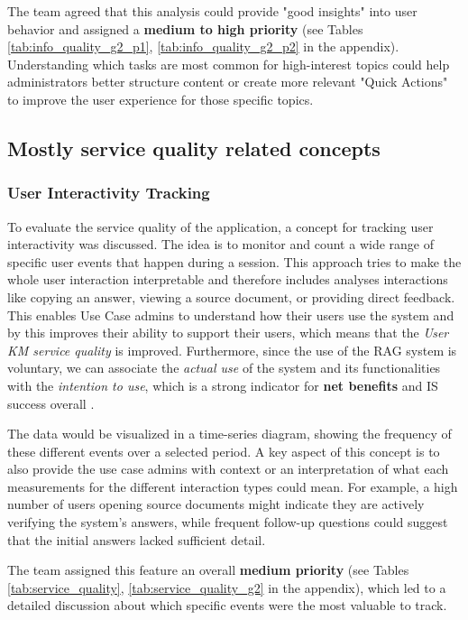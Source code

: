 \documentclass[
	english,
	ruledheaders=section,%
	class=report,%
	thesis={type=bachelor},%
	accentcolor=1b,%
	custommargins=true,%
	marginpar=false,%
	parskip=half-,%
	fontsize=11pt,%
	DIV=14,
]{tudapub}
\begin{document}
The team agreed that this analysis could provide "good insights" into user behavior and assigned a \textbf{medium to high priority} (see Tables \ref{tab:info_quality_g2_p1}, \ref{tab:info_quality_g2_p2} in the appendix). Understanding which tasks are most common for high-interest topics could help administrators better structure content or create more relevant "Quick Actions" to improve the user experience for those specific topics.
\subsection{Mostly service quality related concepts}
\subsubsection{User Interactivity Tracking}
To evaluate the service quality \parencite[p.~18]{DeloneMcLean2003ISSuccessTenYearUpdate} of the application, a concept for tracking user interactivity was discussed. The idea is to monitor and count a wide range of specific user events that happen during a session. This approach tries to make the whole user interaction interpretable and therefore includes analyses interactions like copying an answer, viewing a source document, or providing direct feedback. This enables Use Case admins to understand how their users use the system and by this improves their ability to support their users, which means that the \textit{User KM service quality} \parencite[pp.~58--59]{DeloneMcLean2003ISSuccessTenYearUpdate} is improved. Furthermore, since the use of the RAG system is voluntary, we can associate the \textit{actual use} of the system and its functionalities with the \textit{intention to use}, which is a strong indicator for \textbf{net benefits} and IS success overall \parencite[p.~23--24]{DeloneMcLean2003ISSuccessTenYearUpdate}.

The data would be visualized in a time-series diagram, showing the frequency of these different events over a selected period. A key aspect of this concept is to also provide the use case admins with context or an interpretation of what each measurements for the different interaction types could mean. For example, a high number of users opening source documents might indicate they are actively verifying the system's answers, while frequent follow-up questions could suggest that the initial answers lacked sufficient detail.

The team assigned this feature an overall \textbf{medium priority} (see Tables \ref{tab:service_quality}, \ref{tab:service_quality_g2} in the appendix), which led to a detailed discussion about which specific events were the most valuable to track.
\end{document}
